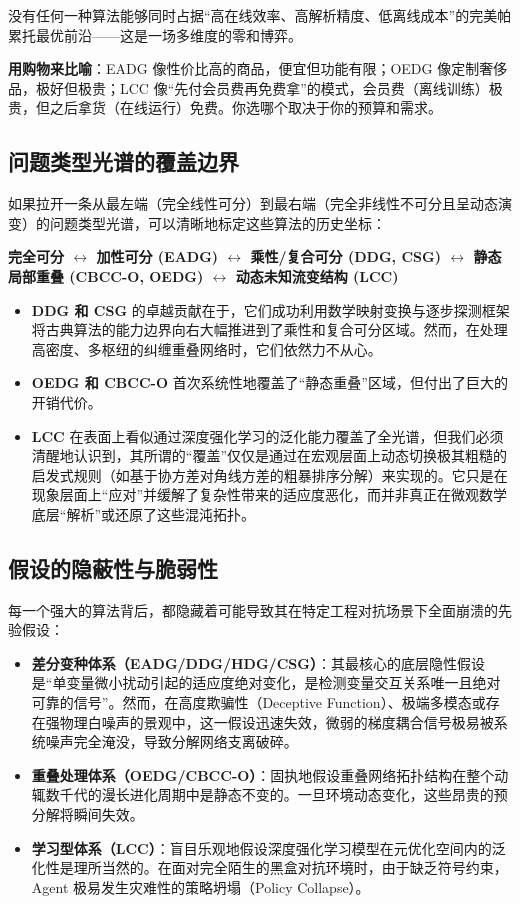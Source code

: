 没有任何一种算法能够同时占据“高在线效率、高解析精度、低离线成本”的完美帕累托最优前沿——这是一场多维度的零和博弈。

\textbf{用购物来比喻}：EADG 像性价比高的商品，便宜但功能有限；OEDG 像定制奢侈品，极好但极贵；LCC 像“先付会员费再免费拿”的模式，会员费（离线训练）极贵，但之后拿货（在线运行）免费。你选哪个取决于你的预算和需求。

\subsection{问题类型光谱的覆盖边界}
如果拉开一条从最左端（完全线性可分）到最右端（完全非线性不可分且呈动态演变）的问题类型光谱，可以清晰地标定这些算法的历史坐标：

\textbf{完全可分 $\longleftrightarrow$ 加性可分 (EADG) $\longleftrightarrow$ 乘性/复合可分 (DDG, CSG) $\longleftrightarrow$ 静态局部重叠 (CBCC-O, OEDG) $\longleftrightarrow$ 动态未知流变结构 (LCC)}

\begin{itemize}
    \item \textbf{DDG 和 CSG} 的卓越贡献在于，它们成功利用数学映射变换与逐步探测框架将古典算法的能力边界向右大幅推进到了乘性和复合可分区域。然而，在处理高密度、多枢纽的纠缠重叠网络时，它们依然力不从心。
    \item \textbf{OEDG 和 CBCC-O} 首次系统性地覆盖了“静态重叠”区域，但付出了巨大的开销代价。
    \item \textbf{LCC} 在表面上看似通过深度强化学习的泛化能力覆盖了全光谱，但我们必须清醒地认识到，其所谓的“覆盖”仅仅是通过在宏观层面上动态切换极其粗糙的启发式规则（如基于协方差对角线方差的粗暴排序分解）来实现的。它只是在现象层面上“应对”并缓解了复杂性带来的适应度恶化，而并非真正在微观数学底层“解析”或还原了这些混沌拓扑。
\end{itemize}

\subsection{假设的隐蔽性与脆弱性}
每一个强大的算法背后，都隐藏着可能导致其在特定工程对抗场景下全面崩溃的先验假设：

\begin{itemize}
    \item \textbf{差分变种体系（EADG/DDG/HDG/CSG）}：其最核心的底层隐性假设是“单变量微小扰动引起的适应度绝对变化，是检测变量交互关系唯一且绝对可靠的信号”。然而，在高度欺骗性（Deceptive Function）、极端多模态或存在强物理白噪声的景观中，这一假设迅速失效，微弱的梯度耦合信号极易被系统噪声完全淹没，导致分解网络支离破碎。
    \item \textbf{重叠处理体系（OEDG/CBCC-O）}：固执地假设重叠网络拓扑结构在整个动辄数千代的漫长进化周期中是静态不变的。一旦环境动态变化，这些昂贵的预分解将瞬间失效。
    \item \textbf{学习型体系（LCC）}：盲目乐观地假设深度强化学习模型在元优化空间内的泛化性是理所当然的。在面对完全陌生的黑盒对抗环境时，由于缺乏符号约束，Agent 极易发生灾难性的策略坍塌（Policy Collapse）。
\end{itemize}

